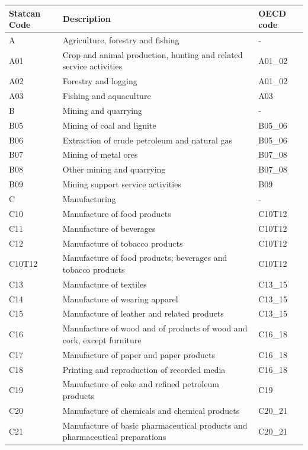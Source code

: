 \documentclass{article}
\begin{document}
\small
{}
\begin{tabularx}{\textwidth}{l X l}
\hline
\textbf{Statcan Code} & \textbf{Description} & \textbf{OECD code} \\
\hline
\hline
A       & Agriculture, forestry and fishing & - \\
A01     & Crop and animal production, hunting and related service activities & A01\_02 \\
A02     & Forestry and logging & A01\_02 \\
A03     & Fishing and aquaculture & A03 \\
B       & Mining and quarrying & - \\
B05     & Mining of coal and lignite & B05\_06 \\
B06     & Extraction of crude petroleum and natural gas & B05\_06 \\
B07     & Mining of metal ores & B07\_08 \\
B08     & Other mining and quarrying & B07\_08 \\
B09     & Mining support service activities & B09 \\
C       & Manufacturing & - \\
C10     & Manufacture of food products & C10T12 \\
C11     & Manufacture of beverages & C10T12 \\
C12     & Manufacture of tobacco products & C10T12 \\
C10T12  & Manufacture of food products; beverages and tobacco products & C10T12 \\
C13     & Manufacture of textiles & C13\_15 \\
C14     & Manufacture of wearing apparel & C13\_15 \\
C15     & Manufacture of leather and related products & C13\_15 \\
C16     & Manufacture of wood and of products of wood and cork, except furniture & C16\_18 \\
C17     & Manufacture of paper and paper products & C16\_18 \\
C18     & Printing and reproduction of recorded media & C16\_18 \\
C19     & Manufacture of coke and refined petroleum products & C19 \\
C20     & Manufacture of chemicals and chemical products & C20\_21 \\
C21     & Manufacture of basic pharmaceutical products and pharmaceutical preparations & C20\_21 \\

\end{tabularx}
\end{document}
